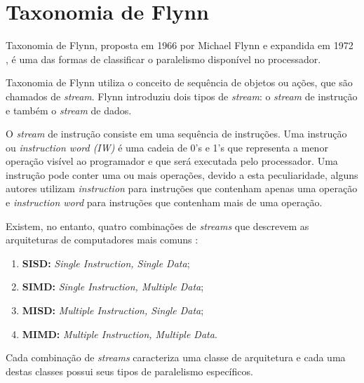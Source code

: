 \section{Taxonomia de Flynn}

Taxonomia de Flynn, proposta em 1966 \cite{Flynn:1966} por Michael 
Flynn e expandida em 1972 \cite{Flynn:1972}, é uma das formas de classificar o 
paralelismo disponível no processador.  

Taxonomia de Flynn utiliza o conceito de sequência de objetos ou ações, que são
chamados de \textit{stream}.
Flynn introduziu dois tipos de \textit{stream}: o 
\textit{stream} de instrução e também o \textit{stream} de dados. 

O \textit{stream} de instrução consiste em uma sequência de instruções. 
Uma instrução ou \textit{instruction word (IW)} é uma cadeia de 0's e 1's que 
representa a menor operação visível ao programador e que será executada pelo 
processador. 
Uma instrução pode conter uma ou mais operações, devido a esta peculiaridade,
alguns autores utilizam \textit{instruction} para instruções que contenham 
apenas uma operação e \textit{instruction word} para instruções que contenham 
mais de uma operação.

\begin{comment}
Processadores escalares (\textit{scalar processors}) e processadores
superescalares (\textit{superscalar processors}) executam uma ou mais
\textit{instructions} por ciclo de \textit{clock} da máquina. 
\end{comment}

Existem, no entanto, quatro combinações de \textit{streams} que descrevem as 
arquiteturas de computadores mais comuns \cite{Flynn:1996}:

\begin{enumerate}
        \item \textbf{SISD:} \textit{Single Instruction, Single Data};
        \item \textbf{SIMD:} \textit{Single Instruction, Multiple Data};
        \item \textbf{MISD:} \textit{Multiple Instruction, Single Data};
        \item \textbf{MIMD:} \textit{Multiple Instruction, Multiple Data}.
\end{enumerate}

Cada combinação de \textit{streams} caracteriza uma classe de arquitetura 
e cada uma destas classes possui seus tipos de paralelismo específicos.


